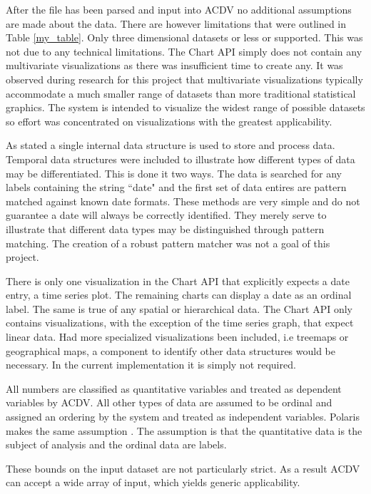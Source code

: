 \documentclass[a4paper, 11pt, titlepage, onehalfspacing]{report}
\begin{document}
After the file has been parsed and input into AC\lightning{}DV no additional assumptions are made about the data. There are however limitations that were outlined in Table \ref{my_table}. Only three dimensional datasets or less or supported. This was not due to any technical limitations. The Chart API simply does not contain any multivariate visualizations as there was insufficient time to create any. It was observed during research for this project that multivariate visualizations typically accommodate a much smaller range of datasets than more traditional statistical graphics. The system is intended to visualize the widest range of possible datasets so effort was concentrated on visualizations with the greatest applicability.

As stated a single internal data structure is used to store and process data. Temporal data structures were included to illustrate how different types of data may be differentiated. This is done it two ways. The data is searched for any labels containing the string ``date" and the first set of data entires are pattern matched against known date formats. These methods are very simple and do not guarantee a date will always be correctly identified. They merely serve to illustrate that different data types may be distinguished through pattern matching. The creation of a robust pattern matcher was not a goal of this project. 

There is only one visualization in the Chart API that explicitly expects a date entry, a time series plot. The remaining charts can display a date as an ordinal label. The same is true of any spatial or hierarchical data. The Chart API only contains visualizations, with the exception of the time series graph, that expect linear data. Had more specialized visualizations been included, i.e treemaps or geographical maps, a component to identify other data structures would be necessary. In the current implementation it is simply not required.

All numbers are classified as quantitative variables and treated as dependent variables by AC\lightning{}DV. All other types of data are assumed to be ordinal and assigned an ordering by the system and treated as independent variables. Polaris makes the same assumption \cite{stolte2002polaris}. The assumption is that the quantitative data is the subject of analysis and the ordinal data are labels.

These bounds on the input dataset are not particularly strict. As a result AC\lightning{}DV can accept a wide array of input, which yields generic applicability.
\end{document}

